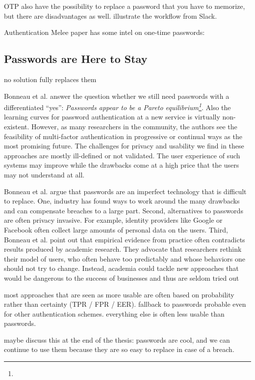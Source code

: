 OTP also have the possibility to replace a password that you have to memorize, but there are disadvantages as well. 
illustrate the workflow from Slack.

Authentication Melee paper has some intel on one-time passwords: \cite{Ruoti2015AuthenticationMelee}


\subsection{Passwords are Here to Stay}
no solution fully replaces them

Bonneau et al. answer the question whether we still need passwords with a differentiated ``yes'': \textit{Passwords appear to be a Pareto equilibrium\footnote{}}. Also the learning curves for password authentication at a new service is virtually non-existent. However, as many researchers in the community, the authors see the feasibility of multi-factor authentication in progressive or continual ways as the most promising future. The challenges for privacy and usability we find in these approaches are mostly ill-defined or not validated. The user experience of such systems may improve while the drawbacks come at a high price that the users may not understand at all. 

Bonneau et al. argue \cite{Bonneau2015ImperfectAuthentication} that passwords are an imperfect technology that is difficult to replace. One, industry has found ways to work around the many drawbacks and can compensate breaches to a large part. Second, alternatives to passwords are often privacy invasive. For example, identity providers like Google or Facebook often collect large amounts of personal data on the users. Third, Bonneau et al. point out that empirical evidence from practice often contradicts results produced by academic research. They advocate that researchers rethink their model of users, who often behave too predictably and whose behaviors one should not try to change. Instead, academia could tackle new approaches that would be dangerous to the success of businesses and thus are seldom tried out

most approaches that are seen as more usable are often based on probability rather than certainty (TPR / FPR / EER). fallback to passwords probable even for other authentication schemes. everything else is often less usable than passwords. 

maybe discuss this at the end of the thesis: passwords are cool, and we can continue to use them because they are so easy to replace in case of a breach. 

